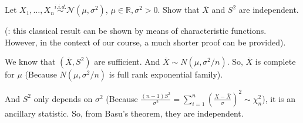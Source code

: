 \documentclass[12pt]{article}
\begin{document}
    \begin{exercise}
        Let \(X_{1}, \ldots, X_{n} \stackrel{i.i.d. }{\sim} \mathcal{N}\left(\mu, \sigma^{2}\right)\), \(\mu \in \mathbb{R}, \sigma^{2}>0 .\) Show that \(\bar{X}\) and \(S^{2}\) are independent. 
        
        (: this classical result can be shown by means of characteristic functions. However, in the context of our course, a much shorter proof can be provided). 
    \end{exercise}
    
    \begin{solution}
        We know that $(\bar{X}, S^2)$ are sufficient. And $\bar{X}\sim N(\mu,\sigma^2/n)$. So, $\bar{X}$ is complete for $\mu$ (Because $N(\mu,\sigma^2/n)$ is full rank exponential family). 
            
        And $S^2$ only depends on $\sigma^2$ (Because $\frac{(n-1)S^2}{\sigma^2}=\sum_{i=1}^n(\frac{X-\bar{X}}{\sigma})^2\sim\chi_n^2$), it is an ancillary statistic. So, from Basu's theorem, they are independent. 
    \end{solution}
\end{document}
